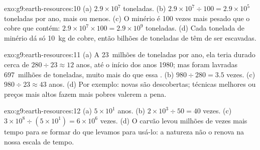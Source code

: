 \begin{solution}{exo:g9:earth-resources:10}
(a) $2.9 \times 10^7$ toneladas. (b) $2.9 \times 10^7 \div 100 = 2.9 \times
10^5$ toneladas por ano, mais ou menos. (c) O minério é 100 vezes mais
pesado que o cobre que contém: $2.9 \times 10^7 \times 100 = 2.9 \times 10^9$ toneladas.
(d) Cada tonelada de minério dá só \qty{10}{kg} de cobre, então bilhões
de toneladas de  têm de ser escavadas.
\end{solution}

\begin{solution}{exo:g9:earth-resources:11}
(a) A 23~milhões de toneladas por ano, ela teria durado cerca de $280 \div 23
\approx 12$ anos, até o início dos anos 1980; mas foram lavradas
697~milhões de toneladas, muito mais do que essa . (b) $980 \div 280 = 3.5$ vezes.
(c) $980 \div
23 \approx 43$ anos. (d) Por exemplo: novas  são descobertas;
técnicas melhores ou preços mais altos fazem  mais pobres valerem
a pena.
\end{solution}

\begin{solution}{exo:g9:earth-resources:12}
(a) $5 \times 10^1$ anos. (b) $2 \times 10^3 \div 50 = 40$ vezes. (c) $3
\times 10^8 \div (5 \times 10^1) = 6 \times 10^6$ vezes. (d) O carvão
levou milhões de vezes mais tempo para se formar do que levamos para
usá-lo: a natureza não o renova na nossa escala de tempo.
\end{solution}

